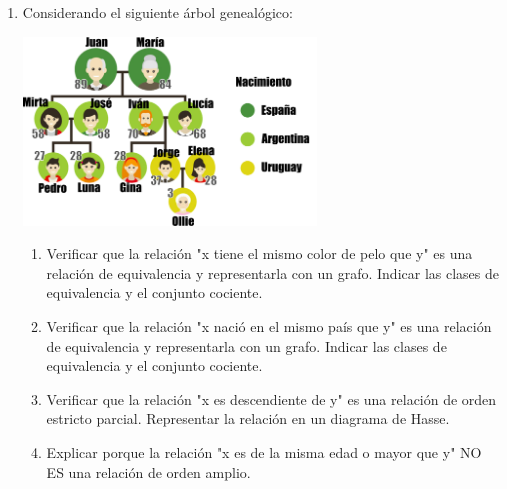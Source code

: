 \documentclass[a4paper]{article}
\newcommand{\exercise}{\item}
\begin{document}
\begin{enumerate}
\begin{enumerate} [label=(\alph*)]
		\item Dada la relación $R$ definida en $\mathbb{R}$, se establece la relación como "$x$ es divisor de $y$" donde $x\mathrel{R}y$ se anota $x~|~y$ definida de la forma $R = \left\lbrace (x,y) ~|~ \exists n \in \mathbb{N} ~~( y=n.x ) \right\rbrace$
		\item Dados dos conjuntos $A$ y $B$ se define la relación "$A$ es subconjunto de en $B$" donde $x\mathrel{R}y$ se anota $A\subseteq B$ definida de la forma $R = \left\lbrace (A,B) ~|~ \forall x \in A ~~( x\in A \to x\in B) \right\rbrace$
		\item Dada la relación $R$ definida en $\mathbb{R}$, se establece la relación "$x$ es menor que $y$" donde $x\mathrel{R}y$ se anota $x<y$ definida de la forma $R = \left\lbrace (x,y) ~|~ \exists k \in (0,+\infty) ~~(y=x+k)  \right\rbrace$
	\end{enumerate}
	\exercise Considerando el siguiente árbol genealógico: \\ \begin{center} \includegraphics[height=5cm]{familia.png} \end{center}
	\begin{enumerate} [label=(\alph*)]
		\item Verificar que la relación "x tiene el mismo color de pelo que y" es una relación de equivalencia y representarla con un grafo. Indicar las clases de equivalencia y el conjunto cociente.
		\item Verificar que la relación "x nació en el mismo país que y" es una relación de equivalencia y representarla con un grafo. Indicar las clases de equivalencia y el conjunto cociente.
		\item Verificar que la relación "x es descendiente de y" es una relación de orden estricto parcial. Representar la relación en un diagrama de Hasse.
		\item Explicar porque la relación "x es de la misma edad o mayor que y" NO ES una relación de orden amplio.

\end{enumerate}
\end{enumerate}
\end{document}
